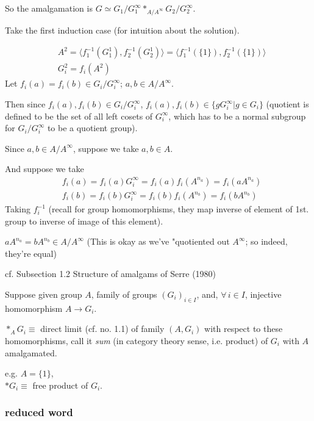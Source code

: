 \documentclass[10pt]{amsart}
\begin{document}
\begin{multicols*}{2}
So the amalgamation is $G \simeq G_1/G_1^{\infty} *_{A/A^{\infty}} G_2/G_2^{\infty}$.  

Take the first induction case (for intuition about the solution).  

\[
\begin{aligned}
	& A^2 = \langle f_1^{-1}( G_1^1), f_2^{-1}(G_2^1) \rangle = \langle f_1^{-1}(\lbrace 1 \rbrace), f_2^{-1}(\lbrace 1 \rbrace ) \rangle \\
	& G_i^2 = f_i(A^2)
\end{aligned}
\]
Let $f_i(a) = f_i(b) \in G_i/G_i^{\infty}$; $a,b\in A/A^{\infty}$.  

Then since $f_i(a),f_i(b) \in G_i/G_i^{\infty}$, $f_i(a),f_i(b) \in \lbrace gG_i^{\infty} | g\in G_i \rbrace$ (quotient is defined to be the set of all left cosets of $G_i^{\infty}$, which has to be a normal subgroup for $G_i/G_i^{\infty}$ to be a quotient group).  

Since $a,b \in A/A^{\infty}$, suppose we take $a,b\in A$.  

And suppose we take 
\[
\begin{aligned}
& 	f_i(a) = f_i(a)G_i^{\infty} = f_i(a) f_i(A^{n_a} ) = f_i(aA^{n_a}) \\ 
& 	f_i(b) = f_i(b)G_i^{\infty} = f_i(b) f_i(A^{n_b} ) = f_i(bA^{n_b})  
\end{aligned}
\]
Taking $f_i^{-1}$ (recall for group homomorphisms, they map inverse of element of 1st. group to inverse of image of this element).  

$aA^{n_a}=bA^{n_b}\in A/A^{\infty}$ (This is okay as we've "quotiented out $A^{\infty}$; so indeed, they're equal)


cf. Subsection 1.2 Structure of amalgams of Serre (1980) \cite{Serr1980} 

Suppose given group $A$, family of groups $(G_i)_{i\in I}$, and, $\forall \, i\in I$, injective homomorphism $A\to G_i$.  

$*_A G_i \equiv $ direct limit (cf. no. 1.1) of family $(A,G_i)$ with respect to these homomorphisms, call it \emph{sum} (in category theory sense, i.e. product) of $G_i$ with $A$ amalgamated.  

e.g. $A=\lbrace 1 \rbrace$, \\
$*G_i \equiv $ free product of $G_i$.  

\subsubsection{reduced word}  


\end{multicols*}
\end{document}
